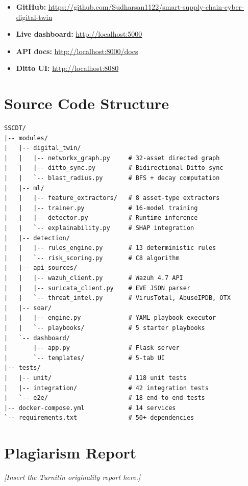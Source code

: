 \documentclass[12pt,a4paper]{amritareport}
\begin{document}
\begin{itemize}
    \item \textbf{GitHub:} \url{https://github.com/Sudharsan1122/smart-supply-chain-cyber-digital-twin}
    \item \textbf{Live dashboard:} \url{http://localhost:5000}
    \item \textbf{API docs:} \url{http://localhost:8000/docs}
    \item \textbf{Ditto UI:} \url{http://localhost:8080}
\end{itemize}

\chapter{Source Code Structure}

\begin{lstlisting}[language={}, caption={SSCDT source code organization}]
SSCDT/
|-- modules/
|   |-- digital_twin/
|   |   |-- networkx_graph.py     # 32-asset directed graph
|   |   |-- ditto_sync.py         # Bidirectional Ditto sync
|   |   `-- blast_radius.py       # BFS + decay computation
|   |-- ml/
|   |   |-- feature_extractors/   # 8 asset-type extractors
|   |   |-- trainer.py            # 16-model training
|   |   |-- detector.py           # Runtime inference
|   |   `-- explainability.py     # SHAP integration
|   |-- detection/
|   |   |-- rules_engine.py       # 13 deterministic rules
|   |   `-- risk_scoring.py       # C8 algorithm
|   |-- api_sources/
|   |   |-- wazuh_client.py       # Wazuh 4.7 API
|   |   |-- suricata_client.py    # EVE JSON parser
|   |   `-- threat_intel.py       # VirusTotal, AbuseIPDB, OTX
|   |-- soar/
|   |   |-- engine.py             # YAML playbook executor
|   |   `-- playbooks/            # 5 starter playbooks
|   `-- dashboard/
|       |-- app.py                # Flask server
|       `-- templates/            # 5-tab UI
|-- tests/
|   |-- unit/                     # 118 unit tests
|   |-- integration/              # 42 integration tests
|   `-- e2e/                      # 18 end-to-end tests
|-- docker-compose.yml            # 14 services
`-- requirements.txt              # 50+ dependencies
\end{lstlisting}

\chapter{Plagiarism Report}

\textit{[Insert the Turnitin originality report here.]}
\end{document}

